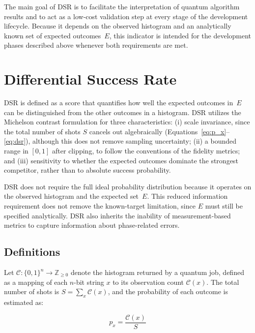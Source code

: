 \documentclass[pdflatex,sn-mathphys-num]{sn-jnl}
\theoremstyle{thmstyleone}%
\theoremstyle{thmstyletwo}%
\theoremstyle{thmstylethree}%
\begin{document}
The main goal of DSR is to facilitate the interpretation of quantum algorithm results and to act as a low-cost validation step at every stage of the development lifecycle. Because it depends on the observed histogram and an analytically known set of expected outcomes~$E$, this indicator is intended for the development phases described above whenever both requirements are met.

\FloatBarrier
\section{Differential Success Rate}\label{sec:dsr}

DSR is defined as a score that quantifies how well the expected outcomes in~$E$ can be distinguished from the other outcomes in a histogram. DSR utilizes the Michelson contrast formulation \cite{michelsonInterferenceMethods_1890, michelsonStudiesOptics_1927} for three characteristics: (i) scale invariance, since the total number of shots $S$ cancels out algebraically (Equations~\eqref{eq:p_x}--\eqref{eq:dsr}), although this does not remove sampling uncertainty; (ii) a bounded range in $[0,1]$ after clipping, to follow the conventions of the fidelity metrics; and (iii) sensitivity to whether the expected outcomes dominate the strongest competitor, rather than to absolute success probability.

DSR does not require the full ideal probability distribution because it operates on the observed histogram and the expected set~$E$. This reduced information requirement does not remove the known-target limitation, since $E$ must still be specified analytically. DSR also inherits the inability of measurement-based metrics to capture information about phase-related errors.

\subsection{Definitions}

Let $\mathcal{C} : \{0,1\}^n \to \mathbb{Z}_{\geq 0}$ denote the histogram returned by a quantum job, defined as a mapping of each $n$-bit string $x$ to its observation count $\mathcal{C}(x)$. The total number of shots is $S = \sum_{x} \mathcal{C}(x)$, and the probability of each outcome is estimated as:

\begin{equation}
\label{eq:p_x}
    p_{x} = \frac{\mathcal{C}(x)}{S}
\end{equation}
\end{document}
